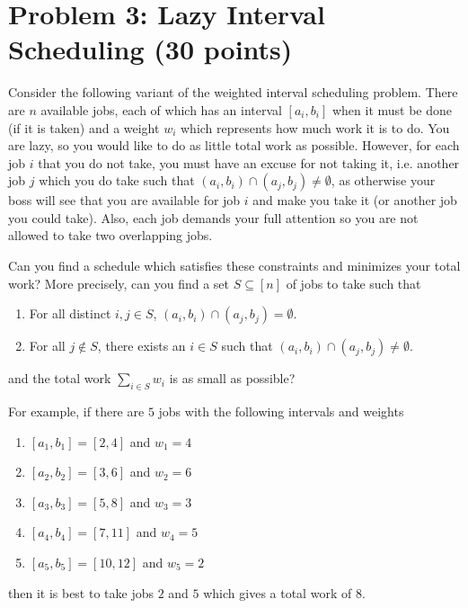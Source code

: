 \documentclass[12pt]{article}
\begin{document}
\section*{Problem 3: Lazy Interval Scheduling (30 points)}
Consider the following variant of the weighted interval scheduling problem. There are $n$ available jobs, each of which has an interval $[a_i,b_i]$ when it must be done (if it is taken) and a weight $w_i$ which represents how much work it is to do. You are lazy, so you would like to do as little total work as possible. However, for each job $i$ that you do not take, you must have an excuse for not taking it, i.e. another job $j$ which you do take such that $(a_i,b_i) \cap (a_j,b_j) \neq \emptyset$, as otherwise your boss will see that you are available for job $i$ and make you take it (or another job you could take). Also, each job demands your full attention so you are not allowed to take two overlapping jobs. 

Can you find a schedule which satisfies these constraints and minimizes your total work? More precisely, can you find a set $S \subseteq [n]$ of jobs to take such that 
\begin{enumerate}
\item For all distinct $i,j \in S$, $(a_i,b_i) \cap (a_j,b_j) = \emptyset$.
\item For all $j \notin S$, there exists an $i \in S$ such that $(a_i,b_i) \cap (a_j,b_j) \neq \emptyset$.
\end{enumerate}
and the total work $\sum_{i \in S}{w_i}$ is as small as possible?

For example, if there are $5$ jobs with the following intervals and weights
\begin{enumerate}
\item $[a_1,b_1] = [2,4]$ and $w_1 = 4$
\item $[a_2,b_2] = [3,6]$ and $w_2 = 6$ 
\item $[a_3,b_3] = [5,8]$ and $w_3 = 3$ 
\item $[a_4,b_4] = [7,11]$ and $w_4 = 5$ 
\item $[a_5,b_5] = [10,12]$ and $w_5 = 2$ 
\end{enumerate}
then it is best to take jobs $2$ and $5$ which gives a total work of $8$.
\end{document}

